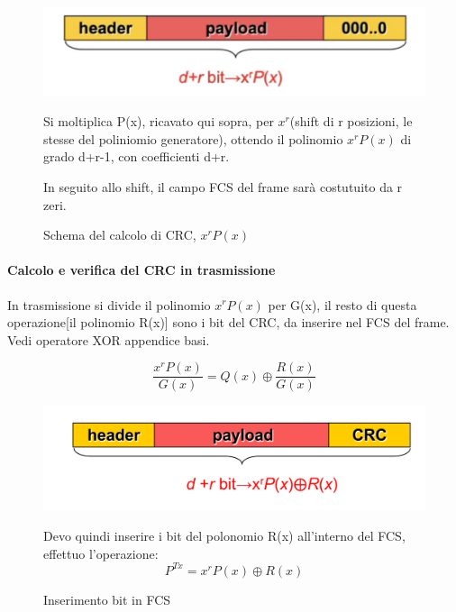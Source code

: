 \begin{figure}[htbp]
    \centering
   \begin{minipage}{0.5\textwidth}
        \includegraphics[width=\linewidth]{images/crcricezione.png}
        \caption{Schema del calcolo di CRC, $x^rP(x)$}
    \end{minipage}
    \hfill
     \begin{minipage}{0.45\textwidth}
        Si moltiplica P(x), ricavato qui sopra, per $x^r$(shift di r posizioni, le stesse del poliniomio generatore), ottendo il polinomio $x^rP(x)$ di grado d+r-1, con coefficienti d+r.
      
        In seguito allo shift, il campo FCS del frame sarà costutuito da r zeri.
    \end{minipage}%
\end{figure}

\paragraph{Calcolo e verifica del CRC in trasmissione}
In trasmissione si divide il polinomio $x^rP(x)$ per G(x), il resto di questa operazione[il polinomio R(x)] sono i bit del CRC, da inserire nel FCS del frame.
Vedi operatore XOR appendice basi.

\begin{equation}
    \frac{x^rP(x)}{G(x)} = Q(x) \oplus \frac{R(x)}{G(x)}
\end{equation}


\begin{figure}[htbp]
    \centering
    \begin{minipage}{0.45\textwidth}
        \includegraphics[width=\linewidth]{images/calcolocrc.png}
        \caption{Inserimento bit in FCS}
        \label{fig:calcolo-crc}
    \end{minipage}%
    \hfill
    \begin{minipage}{0.5\textwidth}
        Devo quindi inserire i bit del polonomio R(x) all'interno del FCS, effettuo l'operazione:
\begin{equation}
    P^{Tx} = x^rP(x) \oplus R(x)
\end{equation}
    \end{minipage}
\end{figure}
\newpage


